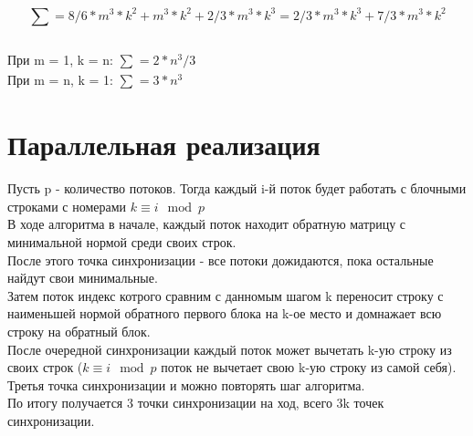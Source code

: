 \documentclass[12pt]{scrreprt}
\begin{document}
$$ \sum_{} = 8/6 * m^3 * k^2 + m^3 * k^2 + 2/3 * m^3 * k^3 = 2/3 * m^3 * k^3 + 7/3 * m^3 * k^2$$\\

При m = 1, k = n: $\sum_{} = 2*n^3/3$\\
При m = n, k = 1: $\sum_{} = 3*n^3$\\

\chapter{Параллельная реализация}
Пусть p - количество потоков. Тогда каждый i-й поток будет работать с блочными строками с номерами $k \equiv i \mod p $\\
В ходе алгоритма в начале, каждый поток находит обратную матрицу с минимальной нормой среди своих строк. \\
После этого точка синхронизации - все потоки дожидаются, пока остальные найдут свои минимальные. \\
Затем поток индекс котрого сравним с данномым шагом k переносит строку с наименьшей нормой обратного первого блока на k-ое место и домнажает всю строку на обратный блок. \\
После очередной синхронизации каждый поток может вычетать k-ую строку из своих строк ($k \equiv i \mod p $ поток не вычетает свою k-ую строку из самой себя).\\
Третья точка синхронизации и можно повторять шаг алгоритма.\\

По итогу получается 3 точки синхронизации на ход, всего 3k точек синхронизации.\\
\end{document}
